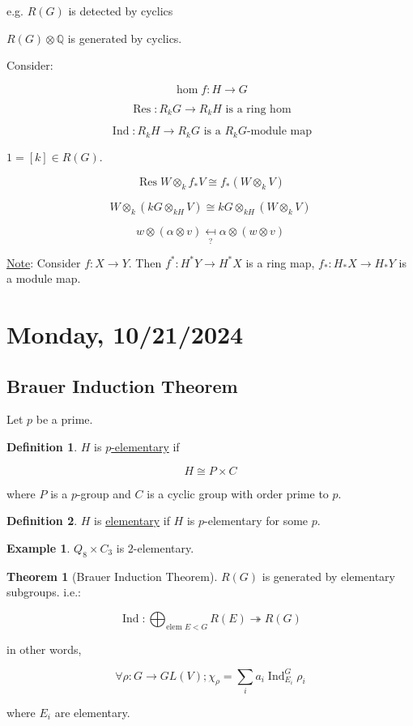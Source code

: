 \documentclass{article}
\theoremstyle{definition}
\newtheorem*{example}{Example}
\newtheorem*{definition}{Definition}
\newtheorem{theorem}{Theorem}
\begin{document}
e.g. \(R(G)\) is detected by cyclics

\(R(G) \otimes \mathbb{Q}\) is generated by cyclics.

Consider:

\[
    \operatorname{hom} f: H \to G
\]

\[
    \operatorname{Res}: R_k G \to R_k H \text{ is a ring hom} 
\]

\[
    \operatorname{Ind}: R_k H \to R_k G \text{ is a \(R_kG\)-module map} 
\]

\(1 = [k] \in R(G)\).

\[
    \operatorname{Res} W \otimes_k f_{\ast} V \cong f_{\ast} (W \otimes_k V)
\]

\[
    W \otimes_k (kG \otimes_{kH} V) \cong kG \otimes_{kH} (W \otimes_k V)
\]

\[
    w \otimes (\alpha \otimes v) \underset{?}{\mapsfrom} \alpha \otimes (w \otimes v)
\]

\underline{Note}: Consider \(f: X \to Y\). Then \(f^{\ast} : H ^{\ast} Y \to H^{\ast} X\) is a ring map, \(f_{\ast}: H_{\ast} X \to H_{\ast} Y\) is a module map.

\section*{Monday, 10/21/2024}

\subsection*{Brauer Induction Theorem}

Let \(p\) be a prime.

\begin{definition}
    \(H\) is \underline{\(p\)-elementary} if

    \[
        H \cong P \times C
    \]

    where \(P\) is a \(p\)-group and \(C\) is a cyclic group with order prime to \(p\).
\end{definition}

\begin{definition}
    \(H\) is \underline{elementary} if \(H\) is \(p\)-elementary for some \(p\).
\end{definition}

\begin{example}
    \(Q_8 \times C_3\) is \(2\)-elementary.
\end{example}

\begin{theorem}
    [Brauer Induction Theorem]

    \(R(G)\) is generated by elementary subgroups. i.e.:

    \[
        \operatorname{Ind}: \bigoplus_{\text{elem } E < G} R(E) \twoheadrightarrow R(G)
    \]

    in other words,

    \[
        \forall \rho : G \to GL(V); \chi_{\rho} = \sum_{i} a_i \operatorname{Ind}_{E_i}^G \rho_i
    \]

    where \(E_i\) are elementary.
\end{theorem}
\end{document}

